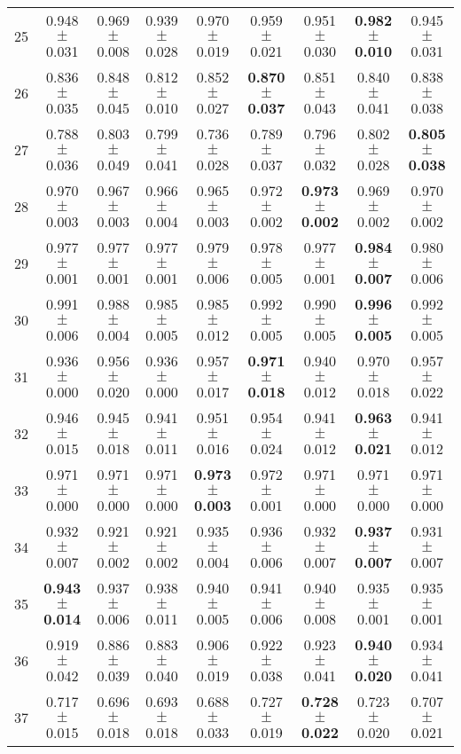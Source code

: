 \begin{table}[!ht]
{\begin{tabular}{r c c c c c c c c}
25 & 0.948 $\pm$ 0.031 & 0.969 $\pm$ 0.008 & 0.939 $\pm$ 0.028 & 0.970 $\pm$ 0.019 & 0.959 $\pm$ 0.021 & 0.951 $\pm$ 0.030 & \textbf{0.982 $\pm$ 0.010} & 0.945 $\pm$ 0.031 \\
26 & 0.836 $\pm$ 0.035 & 0.848 $\pm$ 0.045 & 0.812 $\pm$ 0.010 & 0.852 $\pm$ 0.027 & \textbf{0.870 $\pm$ 0.037} & 0.851 $\pm$ 0.043 & 0.840 $\pm$ 0.041 & 0.838 $\pm$ 0.038 \\
27 & 0.788 $\pm$ 0.036 & 0.803 $\pm$ 0.049 & 0.799 $\pm$ 0.041 & 0.736 $\pm$ 0.028 & 0.789 $\pm$ 0.037 & 0.796 $\pm$ 0.032 & 0.802 $\pm$ 0.028 & \textbf{0.805 $\pm$ 0.038} \\
28 & 0.970 $\pm$ 0.003 & 0.967 $\pm$ 0.003 & 0.966 $\pm$ 0.004 & 0.965 $\pm$ 0.003 & 0.972 $\pm$ 0.002 & \textbf{0.973 $\pm$ 0.002} & 0.969 $\pm$ 0.002 & 0.970 $\pm$ 0.002 \\
29 & 0.977 $\pm$ 0.001 & 0.977 $\pm$ 0.001 & 0.977 $\pm$ 0.001 & 0.979 $\pm$ 0.006 & 0.978 $\pm$ 0.005 & 0.977 $\pm$ 0.001 & \textbf{0.984 $\pm$ 0.007} & 0.980 $\pm$ 0.006 \\
30 & 0.991 $\pm$ 0.006 & 0.988 $\pm$ 0.004 & 0.985 $\pm$ 0.005 & 0.985 $\pm$ 0.012 & 0.992 $\pm$ 0.005 & 0.990 $\pm$ 0.005 & \textbf{0.996 $\pm$ 0.005} & 0.992 $\pm$ 0.005 \\
31 & 0.936 $\pm$ 0.000 & 0.956 $\pm$ 0.020 & 0.936 $\pm$ 0.000 & 0.957 $\pm$ 0.017 & \textbf{0.971 $\pm$ 0.018} & 0.940 $\pm$ 0.012 & 0.970 $\pm$ 0.018 & 0.957 $\pm$ 0.022 \\
32 & 0.946 $\pm$ 0.015 & 0.945 $\pm$ 0.018 & 0.941 $\pm$ 0.011 & 0.951 $\pm$ 0.016 & 0.954 $\pm$ 0.024 & 0.941 $\pm$ 0.012 & \textbf{0.963 $\pm$ 0.021} & 0.941 $\pm$ 0.012 \\
33 & 0.971 $\pm$ 0.000 & 0.971 $\pm$ 0.000 & 0.971 $\pm$ 0.000 & \textbf{0.973 $\pm$ 0.003} & 0.972 $\pm$ 0.001 & 0.971 $\pm$ 0.000 & 0.971 $\pm$ 0.000 & 0.971 $\pm$ 0.000 \\
34 & 0.932 $\pm$ 0.007 & 0.921 $\pm$ 0.002 & 0.921 $\pm$ 0.002 & 0.935 $\pm$ 0.004 & 0.936 $\pm$ 0.006 & 0.932 $\pm$ 0.007 & \textbf{0.937 $\pm$ 0.007} & 0.931 $\pm$ 0.007 \\
35 & \textbf{0.943 $\pm$ 0.014} & 0.937 $\pm$ 0.006 & 0.938 $\pm$ 0.011 & 0.940 $\pm$ 0.005 & 0.941 $\pm$ 0.006 & 0.940 $\pm$ 0.008 & 0.935 $\pm$ 0.001 & 0.935 $\pm$ 0.001 \\
36 & 0.919 $\pm$ 0.042 & 0.886 $\pm$ 0.039 & 0.883 $\pm$ 0.040 & 0.906 $\pm$ 0.019 & 0.922 $\pm$ 0.038 & 0.923 $\pm$ 0.041 & \textbf{0.940 $\pm$ 0.020} & 0.934 $\pm$ 0.041 \\
37 & 0.717 $\pm$ 0.015 & 0.696 $\pm$ 0.018 & 0.693 $\pm$ 0.018 & 0.688 $\pm$ 0.033 & 0.727 $\pm$ 0.019 & \textbf{0.728 $\pm$ 0.022} & 0.723 $\pm$ 0.020 & 0.707 $\pm$ 0.021 \\

\end{tabular}}
\end{table}
